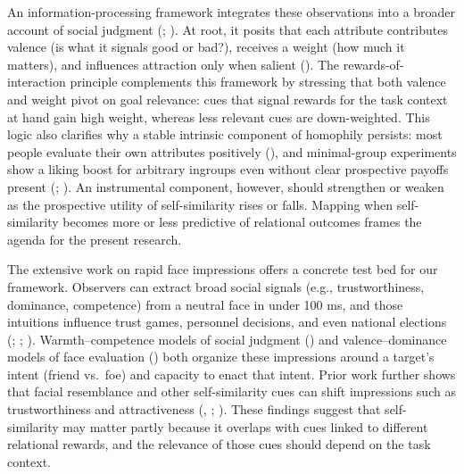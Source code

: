 \documentclass[
  man,
  floatsintext,
  longtable,
  nolmodern,
  notxfonts,
  notimes,
  draftfirst,
  colorlinks=true,linkcolor=blue,citecolor=blue,urlcolor=blue]{apa7}
\begin{document}
An information-processing framework integrates these observations into a
broader account of social judgment
(;
). At root, it
posits that each attribute contributes valence (is what it signals good
or bad?), receives a weight (how much it matters), and influences
attraction only when salient (). The rewards-of-interaction principle complements this
framework by stressing that both valence and weight pivot on goal
relevance: cues that signal rewards for the task context at hand gain
high weight, whereas less relevant cues are down-weighted. This logic
also clarifies why a stable intrinsic component of homophily persists:
most people evaluate their own attributes positively
(), and minimal-group
experiments show a liking boost for arbitrary ingroups even without
clear prospective payoffs present
(;
). An instrumental
component, however, should strengthen or weaken as the prospective
utility of self-similarity rises or falls. Mapping when self-similarity
becomes more or less predictive of relational outcomes frames the agenda
for the present research.

The extensive work on rapid face impressions offers a concrete test bed
for our framework. Observers can extract broad social signals (e.g.,
trustworthiness, dominance, competence) from a neutral face in under 100
ms, and those intuitions influence trust games, personnel decisions, and
even national elections (; ;
). Warmth--competence
models of social judgment () and valence--dominance models of face evaluation
()
both organize these impressions around a target's intent (friend
vs.~foe) and capacity to enact that intent. Prior work further shows
that facial resemblance and other self-similarity cues can shift
impressions such as trustworthiness and attractiveness
(,
;
). These findings
suggest that self-similarity may matter partly because it overlaps with
cues linked to different relational rewards, and the relevance of those
cues should depend on the task context.
\end{document}
